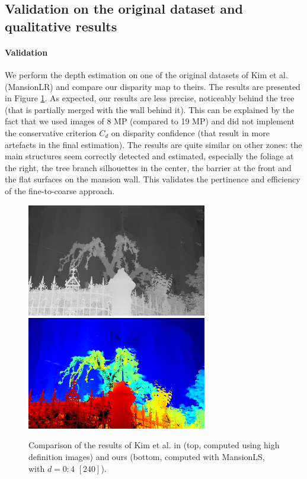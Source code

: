 \documentclass{article}
\theoremstyle{definition}
\begin{document}
\subsection{Validation on the original dataset and qualitative results}


\paragraph{Validation} We perform the depth estimation on one of the original datasets of Kim et al. (MansionLR) and compare our disparity map to theirs. The results are presented in Figure \ref{fig:comparison_kim}. As expected, our results are less precise, noticeably behind the tree (that is partially merged with the wall behind it). This can be explained by the fact that we used images of 8 MP (compared to 19 MP) and did not implement the conservative criterion $C_d$ on disparity confidence (that result in more artefacts in the final estimation). The results are quite similar on other zones: the main structures seem correctly detected and estimated, especially the foliage at the right, the tree branch silhouettes in the center, the barrier at the front and the flat surfaces on the mansion wall. This validates the pertinence and efficiency of the fine-to-coarse approach.


\begin{figure}[ht]
 \centering
 \includegraphics[width=0.7\textwidth]{images/mansion_kim_resized.png}\\
 \includegraphics[width=0.7\textwidth]{images/MansionLR_240/1521776307225_dmap_050.png}
 \caption{Comparison of the results of Kim et al. in \cite{art:kim13:lfields} (top, computed using high definition images) and ours (bottom, computed with MansionLS, with $d=0:4$ $[240]$).}
 \label{fig:comparison_kim}
\end{figure}
\end{document}
